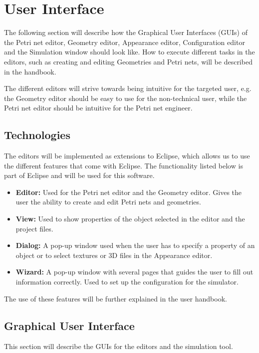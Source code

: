 \section{User Interface}
\label{sec:user-interface}

The following section will describe how the Graphical User Interfaces (GUIs) of the Petri net editor, Geometry editor, Appearance editor, Configuration editor and the Simulation window should look like. How to execute different tasks in the editors, such as creating and editing Geometries and Petri nets, will be described in the handbook. 

The different editors will strive towards being intuitive for the targeted user, e.g. the Geometry editor should be easy to use for the non-technical user, while the Petri net editor should be intuitive for the Petri net engineer.

\subsection{Technologies}
The editors will be implemented as extensions to Eclipse, which allows us to use the different features that come with Eclipse. The functionality listed below is part of Eclipse and will be used for this software.

\begin{itemize}
\item{\textbf{Editor:} Used for the Petri net editor and the Geometry editor. Gives the user the ability to create and edit Petri nets and geometries.}
\item{\textbf{View:} Used to show properties of the object selected in the editor and the project files.}
\item{\textbf{Dialog:} A pop-up window used when the user has to specify a property of an object or to select textures or 3D files in the Appearance editor.}
\item{\textbf{Wizard:} A pop-up window with several pages that guides the user to fill out information correctly. Used to set up the configuration for the simulator.}
\end{itemize}

The use of these features will be further explained in the user handbook. 

\subsection{Graphical User Interface}
This section will describe the GUIs for the editors and the simulation tool. 

